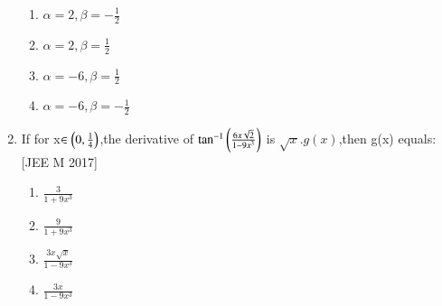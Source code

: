 \documentclass[journal,12pt,twocolumn]{IEEEtran}
\theoremstyle{remark}
\begin{document}
\begin{enumerate}
\begin{multicols}{2}
       
	      \begin{enumerate}
		      \item $\alpha=2,\beta=-\frac{1}{2}$
		      \item $\alpha=2,\beta=\frac{1}{2}$
		      \item $\alpha=-6,\beta=\frac{1}{2}$
		      \item $\alpha=-6,\beta=-\frac{1}{2}$
	      \end{enumerate}
       \end{multicols}
      \item If for x$\in\left(0,\frac{1}{4}\right)$,the derivative of $\tan^{-1}\left(\frac{6x\sqrt{2}}{1-9x^3}\right)$ is $\sqrt{x}.g(x)$,then g(x) equals:
	      \hfill[JEE M 2017]\break
       \begin{multicols}{2}
           
    
	      \begin{enumerate}
		      \item $\frac{3}{1+9x^3}$
		      \item $\frac{9}{1+9x^3}$
		      \item $\frac{3x\sqrt{x}}{1-9x^3}$
		      \item $\frac{3x}{1-9x^3}$
        
	      \end{enumerate}
       \end{multicols}
	      \end{enumerate}
	      
\end{document}
